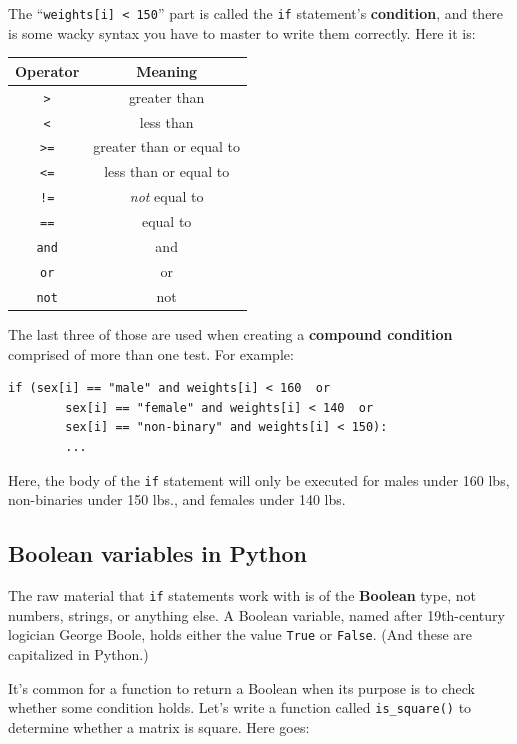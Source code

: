 The ``\texttt{weights[i] < 150}'' part is called the \texttt{if} statement's
\textbf{condition}, and there is some wacky syntax you have to master to write
them correctly. Here it is:

\begin{center}
\begin{tabular}{c|c}
Operator & Meaning \\
\hline
\texttt{>} & greater than \\
\hline
\texttt{<} & less than \\
\hline
\texttt{>=} & greater than or equal to \\
\hline
\texttt{<=} & less than or equal to \\
\hline
\texttt{!=} & \textit{not} equal to \\
\hline
\texttt{==} & equal to \\
\hline
\texttt{and} & and \\
\hline
\texttt{or} & or \\
\hline
\texttt{not} & not \\
\end{tabular}
\end{center}

The last three of those are used when creating a \textbf{compound condition}
comprised of more than one test. For example:

\begin{Verbatim}[fontsize=\small,samepage=true,frame=single,framesep=3mm]
    if (sex[i] == "male" and weights[i] < 160  or
        sex[i] == "female" and weights[i] < 140  or
        sex[i] == "non-binary" and weights[i] < 150):
        ...
\end{Verbatim}

Here, the body of the \texttt{if} statement will only be executed for males
under 160 lbs, non-binaries under 150 lbs., and females under 140 lbs.

\subsection*{Boolean variables in Python}

The raw material that \texttt{if} statements work with is of the
\textbf{Boolean} type, not numbers, strings, or anything else. A Boolean
variable, named after 19th-century logician George Boole, holds either the
value \texttt{True} or \texttt{False}. (And these are capitalized in Python.)

It's common for a function to return a Boolean when its purpose is to check
whether some condition holds. Let's write a function called
\texttt{is\_square()} to determine whether a matrix is square. Here goes:

